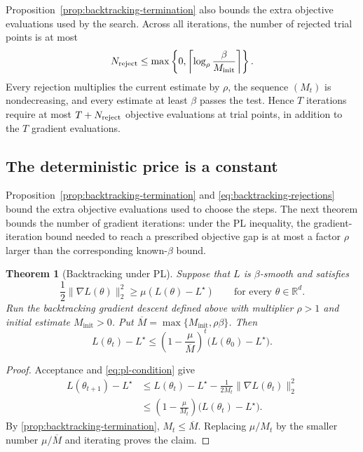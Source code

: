 \documentclass[11pt,twoside]{article}
\newcommand{\R}{\mathbb R}
\newtheorem{theorem}{Theorem}[section]
\theoremstyle{definition}
\theoremstyle{remark}
\begin{document}
Proposition~\ref{prop:backtracking-termination} also bounds the extra
objective evaluations used by the search. Across all iterations, the number
of rejected trial points is
at most
\begin{equation}
 N_{\rm reject}
 \le
 \max\left\{0,
   \left\lceil\log_\rho\frac{\beta}{M_{\mathrm{init}}}\right\rceil
 \right\}.
 \label{eq:backtracking-rejections}
\end{equation}
Every rejection multiplies the current estimate by $\rho$, the sequence
$(M_t)$ is nondecreasing, and every estimate at least $\beta$ passes the test.
Hence $T$
iterations require at most $T+N_{\rm reject}$ objective evaluations at trial
points, in addition to the $T$ gradient evaluations.

\subsection{The deterministic price is a constant}

Proposition~\ref{prop:backtracking-termination} and
\cref{eq:backtracking-rejections} bound the extra objective evaluations used
to choose the steps. The next theorem bounds the number of gradient
iterations: under the PL inequality, the gradient-iteration bound needed to
reach a prescribed objective gap is at most a factor $\rho$ larger than the
corresponding known-$\beta$ bound.

\begin{theorem}[Backtracking under PL]
\label{thm:backtracking-pl}
Suppose that $L$ is $\beta$-smooth and satisfies
\begin{equation}
 \frac12\|\nabla L(\theta)\|_2^2
 \ge\mu(L(\theta)-L^\star)
 \qquad\text{for every }\theta\in\R^d.
 \label{eq:pl-condition}
\end{equation}
Run the backtracking gradient descent defined above with multiplier $\rho>1$
and initial estimate $M_{\mathrm{init}}>0$. Put
$\overline M=\max\{M_{\mathrm{init}},\rho\beta\}$. Then
\begin{equation}
 L(\theta_t)-L^\star
 \le\left(1-\frac\mu{\overline M}\right)^t
      \bigl(L(\theta_0)-L^\star\bigr).
 \label{eq:backtracking-pl-rate}
\end{equation}
\end{theorem}

\begin{proof}
Acceptance and \cref{eq:pl-condition} give
\begin{align*}
 L(\theta_{t+1})-L^\star
 &\le L(\theta_t)-L^\star
      -\frac1{2M_t}\|\nabla L(\theta_t)\|_2^2\\
 &\le\left(1-\frac\mu{M_t}\right)
      \bigl(L(\theta_t)-L^\star\bigr).
\end{align*}
By \cref{prop:backtracking-termination}, $M_t\le\overline M$. Replacing
$\mu/M_t$ by the smaller number $\mu/\overline M$ and iterating proves the
claim.
\end{proof}
\end{document}
